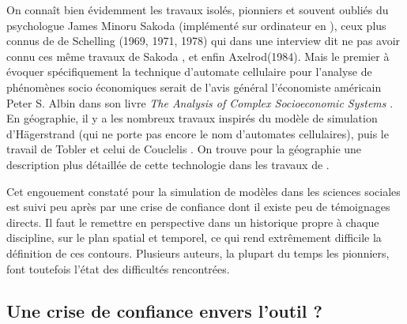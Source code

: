 On connaît bien évidemment les travaux isolés, pionniers et souvent oubliés \autocites{Hegselmann2012, Aydinonat2007} du psychologue James Minoru Sakoda \autocite{Sakoda1949} (implémenté sur ordinateur en \autocite{Sakoda1971}), ceux plus connus de de Schelling (1969, 1971, 1978) \autocite{Ganguly2003} qui dans une interview dit ne pas avoir connu ces même travaux de Sakoda \autocite{Aydinonat2005}, et enfin Axelrod(1984). Mais le premier à évoquer spécifiquement la technique d'automate cellulaire pour l'analyse de phénomènes socio économiques serait de l'avis général l'économiste américain Peter S. Albin dans son livre \textit{The Analysis of Complex Socioeconomic Systems} \textcites{Smith1975, Ganguly2003, Benenson2004, Portugali2000}.  En géographie, il y a les nombreux travaux inspirés du modèle de simulation d'Hägerstrand (qui ne porte pas encore le nom d'automates cellulaires), puis le travail de Tobler \autocites{Tobler1970b, Tobler1979}  et celui de Couclelis \autocite{Couclelis1985}. On trouve pour la géographie une description plus détaillée de cette technologie dans les travaux de \textcite{Louail2010}.



Cet engouement constaté pour la simulation de modèles dans les sciences sociales est suivi peu après par une crise de confiance dont il existe peu de témoignages directs. Il faut le remettre en perspective dans un historique propre à chaque discipline, sur le plan spatial et temporel, ce qui rend extrêmement difficile la définition de ces contours. Plusieurs auteurs, la plupart du temps les pionniers, font toutefois l'état des difficultés rencontrées.


\subsection{Une crise de confiance envers l'outil ?}
\label{sec:critiques_simulation}

